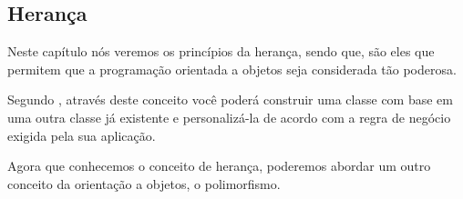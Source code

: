 \subsection{Herança}
\label{heranca}

Neste capítulo nós veremos os princípios da herança, sendo que, são eles que
permitem que a programação orientada a objetos seja considerada tão poderosa.

Segundo , através deste conceito você poderá
construir uma classe com base em uma outra classe já existente e personalizá-la
de acordo com a regra de negócio exigida pela sua aplicação.

Agora que conhecemos o conceito de herança, poderemos abordar um outro conceito
da orientação a objetos, o polimorfismo.
